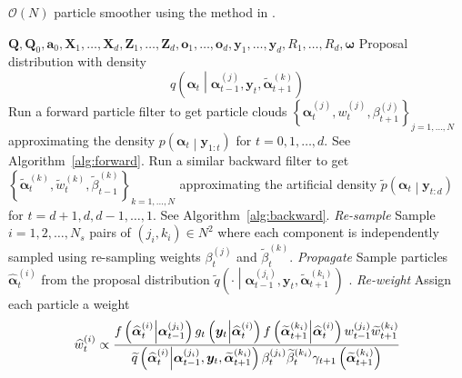 \documentclass[notitlepage]{article}
\newcommand\StateXX{\Statex\hspace{\algorithmicindent}\hspace{\algorithmicindent}}
\renewcommand{\vec}[1]{\bm{#1}}
\newcommand{\mat}[1]{\mathbf{#1}}
\newcommand{\Lbrace}[1]{\left\{ #1\right\}}
\newcommand{\Lparen}[1]{\left( #1\right)}
\newcommand{\Cond}[2]{ #1 \middle\vert  #2}
\newcommand{\optor}[2]{#1\Lparen{#2}}
\newcommand{\optorC}[3]{\optor{#1}{\Cond{#2}{#3}}}
\newcommand{\pdensC}[2]{\optorC{p}{#1}{#2}}
\newcommand{\pdenstC}[2]{\optorC{\widetilde p}{#1}{#2}}
\newcommand{\gFunc}[3]{\optorC{g_{#3}}{#1}{#2}}
\newcommand{\fFunc}[2]{\optorC{f}{#1}{#2}}
\newcommand{\IDC}[2]{\optorC{q}{#1}{#2}}
\newcommand{\IDAproxC}[2]{\optorC{\widetilde{q}}{#1}{#2}}
\newcommand{\partic}[3]{#1_{#2}^{\Lparen{#3}}}
\newcommand{\particB}[3]{\widetilde{#1}_{#2}^{\Lparen{#3}}}
\newcommand{\particS}[3]{\widehat{#1}_{#2}^{\Lparen{#3}}}
\newcommand{\bigO}[1]{\mathcal{O}\Lparen{#1}}
\newcommand{\nPart}{N}
\newcommand{\nPeriods}{d}
\begin{document}
\newpage

\begin{algorithm}[H]
\caption{$\bigO{\nPart}$ particle smoother using the method in \cite{fearnhead10}.}\label{alg:ONsmoother}
\begin{algorithmic}[1]\raggedright
\INPUT
\Statex $
	\mat{Q},\mat{Q}_0,\vec{a}_0,
	\mat{X}_1,\dots,\mat{X}_d,
	\mat{Z}_1,\dots,\mat{Z}_d,
	\vec o_1,\dots,\vec o_d,
	\vec{y}_1,\dots,\vec{y}_d,
	R_1,\dots,R_d,\vec{\omega}$
%
\Statex Proposal distribution with density
\Statex \begin{equation}
	\IDC{\vec{\alpha}_t}{\partic{\vec{\alpha}}{t-1}{j},\vec{y}_t, \particB{\vec{\alpha}}{t+1}{k}}
\end{equation}
%
\State Run a forward particle filter to get particle clouds %
	$\Lbrace{\partic{\vec{\alpha}}{t}{j}, \partic{w}{t}{j}, \partic{\beta}{t + 1}{j}}_{j=1,\dots,\nPart}$ %
	approximating the density $\pdensC{\vec{\alpha}_t}{\vec{y}_{1:t}}$ for $t = 0, 1, \dots, \nPeriods$. See Algorithm~\ref{alg:forward}.
\EndProcedure
%
\State Run a similar backward filter to get %
	$\Lbrace{\particB{\vec{\alpha}}{t}{k}, \particB{w}{t}{k}, \particB{\beta}{t - 1}{k}}_{k=1,\dots,\nPart}$  %
	approximating the artificial density $\pdenstC{\vec{\alpha}_t}{\vec{y}_{t:\nPeriods}}$ for $t = \nPeriods + 1, \nPeriods, \nPeriods - 1, \dots, 1$. See Algorithm~\ref{alg:backward}.
\EndProcedure
%
\For{$t=1,\dots, \nPeriods$}
\StateXX \emph{Re-sample}
\State Sample $i=1,2,\dots,\nPart_s$ pairs of $\Lparen{j_i, k_i}\in\nPart^2$ where each component 
is independently sampled using re-sampling weights $\partic{\beta}{t}{j}$ and $\particB{\beta}{t}{k}$.
%
\StateXX \emph{Propagate}
\State Sample particles $\particS{\vec{\alpha}}{t}{i}$ from the proposal distribution %
	$\IDAproxC{\cdot}{\partic{\vec{\alpha}}{t-1}{j_i},\vec{y}_t, \particB{\vec{\alpha}}{t + 1}{k_i}}$%
.%
\StateXX \emph{Re-weight}
\State Assign each particle a weight
\StateXX \begin{equation}\label{eqn:combineWeight}
 \particS{w}{t}{i} \propto \frac{
 	\fFunc{\particS{\vec{\alpha}}{t}{i}}{\partic{\vec{\alpha}}{t - 1}{j_i}}
 	\gFunc{\vec{y}_t}{\particS{\vec{\alpha}}{t}{i}}{t}
 	\fFunc{\particB{\vec{\alpha}}{t + 1}{k_i}}{\particS{\vec{\alpha}}{t}{i}}
 	\partic{w}{t - 1}{j_i}\particB{w}{t + 1}{k_i}
 	}{ %
 	\IDAproxC{\particS{\vec{\alpha}}{t}{i}}{\partic{\vec{\alpha}}{t-1}{j_i},\vec{y}_t, \particB{\vec{\alpha}}{t+1}{k_i}}
 	\partic{\beta}{t}{j_i}\particB{\beta}{t}{k_i}\gamma_{t +1}\Lparen{\particB{\vec{\alpha}}{t+1}{k_i}}
 	} %
\end{equation}
\EndFor
\EndProcedure
\end{algorithmic}
\end{algorithm}
\end{document}
